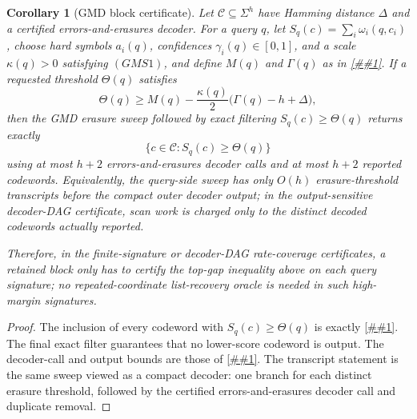\documentclass[10pt]{article}
\newcommand{\cref}[1]{\ref{##1}}
\newtheorem{corollary}[theorem]{Corollary}
\theoremstyle{definition}
\begin{document}
\begin{corollary}[GMD block certificate]
   \label{cor:gmd-block-certificate}
   Let \(\mathcal C\subseteq\Sigma^h\) have Hamming distance \(\Delta\) and a
   certified errors-and-erasures decoder.  For a query \(q\), let
   \(S_q(c)=\sum_i\omega_i(q,c_i)\), choose hard symbols \(a_i(q)\),
   confidences \(\gamma_i(q)\in[0,1]\), and a scale \(\kappa(q)>0\) satisfying
   \((GMS1)\), and define \(M(q)\) and \(\Gamma(q)\) as in
   \cref{lem:soft-score-gmd-margin}.  If a requested threshold \(\Theta(q)\)
   satisfies
   \[
      \Theta(q)\ge
      M(q)-\frac{\kappa(q)}2\bigl(\Gamma(q)-h+\Delta\bigr),
   \]
   then the GMD erasure sweep followed by exact filtering \(S_q(c)\ge\Theta(q)\)
   returns exactly
   \[
      \{c\in\mathcal C:S_q(c)\ge\Theta(q)\}
   \]
   using at most \(h+2\) errors-and-erasures decoder calls and at most \(h+2\)
   reported codewords.  Equivalently, the query-side sweep has only \(O(h)\)
   erasure-threshold transcripts before the compact outer decoder output; in
   the output-sensitive decoder-DAG certificate, scan work is charged only to
   the distinct decoded codewords actually reported.

   Therefore, in the finite-signature or decoder-DAG rate-coverage
   certificates, a retained block only has to certify the top-gap inequality
   above on each query signature; no repeated-coordinate list-recovery oracle
   is needed in such high-margin signatures.
\end{corollary}

\begin{proof}
   The inclusion of every codeword with \(S_q(c)\ge\Theta(q)\) is exactly
   \cref{lem:soft-score-gmd-margin}.  The final exact filter guarantees that
   no lower-score codeword is output.  The decoder-call and output bounds are
   those of \cref{lem:reliability-erasure-sweep}.  The transcript statement is
   the same sweep viewed as a compact decoder: one branch for each distinct
   erasure threshold, followed by the certified errors-and-erasures decoder
   call and duplicate removal.
\end{proof}
\end{document}
